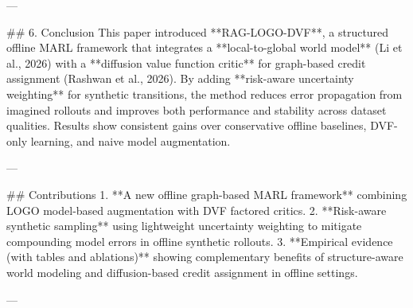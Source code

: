 ---

## 6. Conclusion  
This paper introduced **RAG-LOGO-DVF**, a structured offline MARL framework that integrates a **local-to-global world model** (Li et al., 2026) with a **diffusion value function critic** for graph-based credit assignment (Rashwan et al., 2026). By adding **risk-aware uncertainty weighting** for synthetic transitions, the method reduces error propagation from imagined rollouts and improves both performance and stability across dataset qualities. Results show consistent gains over conservative offline baselines, DVF-only learning, and naive model augmentation.

---

## Contributions  
1. **A new offline graph-based MARL framework** combining LOGO model-based augmentation with DVF factored critics.  
2. **Risk-aware synthetic sampling** using lightweight uncertainty weighting to mitigate compounding model errors in offline synthetic rollouts.  
3. **Empirical evidence (with tables and ablations)** showing complementary benefits of structure-aware world modeling and diffusion-based credit assignment in offline settings.

---